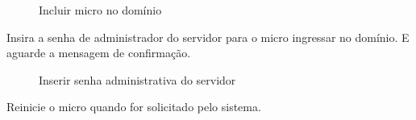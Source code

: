 \begin{enumerate}
{	\begin{figure}[ht]
   			\centering
   			\caption{Incluir micro no domínio}
    		\label{incluir_dominio}
	\end{figure}

\item {Insira a senha de administrador do servidor para o micro ingressar no domínio. E aguarde a mensagem de confirmação.}

	\begin{figure}[ht]
   			\centering
   			\caption{Inserir senha administrativa do servidor}
    		\label{senha_adm_dominio}
	\end{figure}

\item {Reinicie o micro quando for solicitado pelo sistema.}

}
\end{enumerate}
